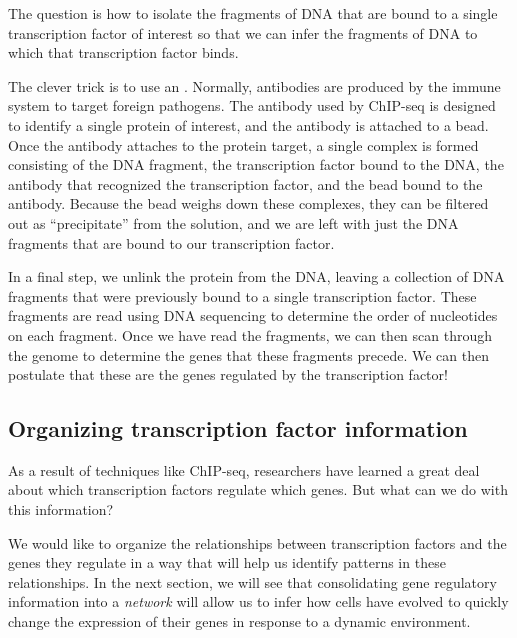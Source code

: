 The question is how to isolate the fragments of DNA that are bound to a single transcription factor of interest so that we can infer the fragments of DNA to which that transcription factor binds.

The clever trick is to use an . Normally, antibodies are produced by the immune system to target foreign pathogens. The antibody used by ChIP-seq is designed to identify a single protein of interest, and the antibody is attached to a bead. Once the antibody attaches to the protein target, a single complex is formed consisting of the DNA fragment, the transcription factor bound to the DNA, the antibody that recognized the transcription factor, and the bead bound to the antibody. Because the bead weighs down these complexes, they can be filtered out as ``precipitate'' from the solution, and we are left with just the DNA fragments that are bound to our transcription factor.

In a final step, we unlink the protein from the DNA, leaving a collection of DNA fragments that were previously bound to a single transcription factor. These fragments are read using DNA sequencing to determine the order of nucleotides on each fragment. Once we have read the fragments, we can then scan through the genome to determine the genes that these fragments precede. We can then postulate that these are the genes regulated by the transcription factor!\\

\begin{qbox}\end{qbox}


\subsection{Organizing transcription factor information}

As a result of techniques like ChIP-seq, researchers have learned a great deal about which transcription factors regulate which genes. But what can we do with this information?

We would like to organize the relationships between transcription factors and the genes they regulate in a way that will help us identify patterns in these relationships. In the next section, we will see that consolidating gene regulatory information into a \textit{network} will allow us to infer how cells have evolved to quickly change the expression of their genes in response to a dynamic environment.\\


